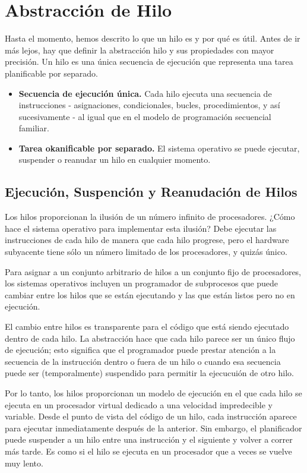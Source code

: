 \documentclass[10pt]{book}
\begin{document}
\section{Abstracción de Hilo}
Hasta el momento, hemos descrito lo que un hilo es y por qué es útil. Antes de ir más lejos, hay que definir la abstracción hilo y sus propiedades con mayor precisión. Un hilo es una única secuencia de ejecución que representa una tarea planificable por separado.

\begin{itemize}
\item  \textbf{Secuencia de ejecución única.} Cada hilo ejecuta una secuencia de instrucciones - asignaciones, condicionales, bucles, procedimientos, y así sucesivamente - al igual que en el modelo de programación secuencial familiar.
\item \textbf{Tarea okanificable por separado.} El sistema operativo se puede ejecutar, suspender o reanudar un hilo en cualquier momento.
\end{itemize}

\subsection{Ejecución, Suspención y Reanudación de Hilos}
Los hilos proporcionan la ilusión de un número infinito de procesadores. ¿Cómo hace el sistema operativo para implementar esta ilusión? Debe ejecutar las instrucciones de cada hilo de manera que cada hilo progrese, pero el hardware subyacente tiene sólo un número limitado de los procesadores, y quizás único.

Para asignar a un conjunto arbitrario de hilos a un conjunto fijo de procesadores, los sistemas operativos incluyen un programador de subprocesos que puede cambiar entre los hilos que se están ejecutando y las que están listos pero no en ejecución.

El cambio entre hilos es transparente para el código que está siendo ejecutado dentro de cada hilo. La abstracción hace que cada hilo parece ser un único flujo de ejecución; esto significa que el programador puede prestar atención a la secuencia de la instrucción dentro o fuera de un hilo o cuando esa secuencia puede ser (temporalmente) suspendido para permitir la ejecucuión de otro hilo.

Por lo tanto, los hilos proporcionan un modelo de ejecución en el que cada hilo se ejecuta en un procesador virtual dedicado a una velocidad impredecible y variable. Desde el punto de vista del código de un hilo, cada instrucción aparece para ejecutar inmediatamente después de la anterior. Sin embargo, el planificador puede suspender a un hilo entre una instrucción y el siguiente y volver a correr más tarde. Es como si el hilo se ejecuta en un procesador que a veces se vuelve muy lento.
\end{document}
